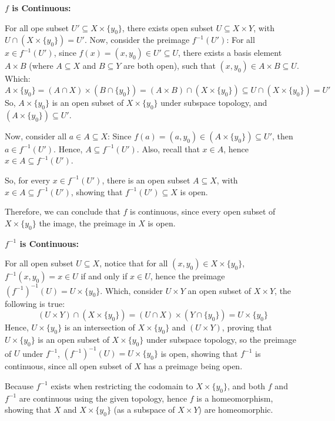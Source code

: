 \documentclass{article}
\begin{document}
\hfill

\textbf{$f$ is Continuous:}

For all ope subset $U'\subseteq X\times \{y_0\}$, there exists open subset $U\subseteq X\times Y$, with $U\cap (X\times \{y_0\}) = U'$.
Now, consider the preimage $f^{-1}(U')$: For all $x\in f^{-1}(U')$, since $f(x)=(x,y_0)\in U' \subseteq U$, there exists a basis element $A\times B$ 
(where $A\subseteq X$ and $B\subseteq Y$ are both open), such that $(x,y_0)\in A\times B \subseteq U$.
Which:
$$A\times \{y_0\} = (A\cap X)\times (B\cap \{y_0\}) = (A\times B)\cap (X\times \{y_0\}) \subseteq U\cap (X\times \{y_0\})=U'$$
So, $A\times \{y_0\}$ is an open subset of $X\times \{y_0\}$ under subspace topology, and $(A\times \{y_0\})\subseteq U'$.

Now, consider all $a\in A\subseteq X$: Since $f(a)=(a,y_0)\in (A\times \{y_0\})\subseteq U'$, then $a\in f^{-1}(U')$.
Hence, $A\subseteq f^{-1}(U')$. Also, recall that $x\in A$, hence $x\in A \subseteq f^{-1}(U')$. 

So, for every $x\in f^{-1}(U')$, there is an open subset $A\subseteq X$, with $x\in A\subseteq f^{-1}(U')$, showing that $f^{-1}(U')\subseteq X$ is open.

Therefore, we can conclude that $f$ is continuous, since every open subset of $X\times \{y_0\}$ the image, the preimage in $X$ is open.

\hfill

\textbf{$f^{-1}$ is Continuous:}

For all open subset $U\subseteq X$, notice that for all $(x,y_0)\in X\times \{y_0\}$, $f^{-1}(x,y_0)=x\in U$ if and only if $x\in U$,
hence the preimage $(f^{-1})^{-1}(U) = U\times \{y_0\}$. Which, consider $U\times Y$ an open subset of $X\times Y$, the following is true:
$$(U\times Y)\cap (X\times \{y_0\}) = (U\cap X)\times (Y\cap \{y_0\}) = U\times \{y_0\}$$
Hence, $U\times \{y_0\}$ is an intersection of $X\times \{y_0\}$ and $(U\times Y)$, proving that $U\times \{y_0\}$ is an open subset of $X\times \{y_0\}$ under subspace topology,
so the preimage of $U$ under $f^{-1}$, $(f^{-1})^{-1}(U) = U\times \{y_0\}$ is open, showing that $f^{-1}$ is continuous, since all open subset of $X$ has a preimage being open.

\hfill

Because $f^{-1}$ exists when restricting the codomain to $X\times \{y_0\}$, and both $f$ and $f^{-1}$ are continuous using the given topology,
hence $f$ is a homeomorphism, showing that $X$ and $X\times \{y_0\}$ (as a subspace of $X\times Y$) are homeomorphic.
\end{document}
